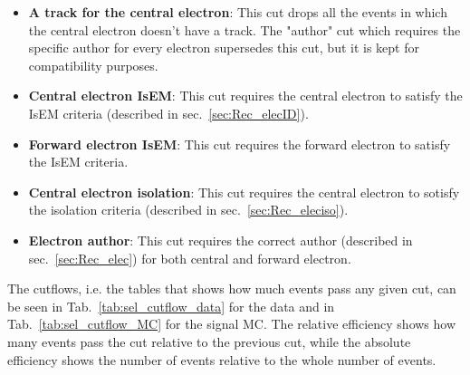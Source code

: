 \begin{itemize}
\item {\bfseries A track for the central electron}: This cut drops all the events in which the central electron doesn't have a track. The "author" cut which requires the specific author for every electron supersedes this cut, but it is kept for compatibility purposes.
\item {\bfseries Central electron IsEM}: This cut requires the central electron to satisfy the IsEM criteria (described in sec.~\ref{sec:Rec_elecID}).
\item {\bfseries Forward electron IsEM}: This cut requires the forward electron to satisfy the IsEM criteria.
\item {\bfseries Central electron isolation}: This cut requires the central electron to sotisfy the isolation criteria (described in sec.~\ref{sec:Rec_eleciso}).
\item {\bfseries Electron author}: This cut requires the correct author (described in sec.~\ref{sec:Rec_elec}) for both central and forward electron.
\end{itemize}

The cutflows, i.e. the tables that shows how much events pass any given cut, can be seen in Tab.~\ref{tab:sel_cutflow_data} for the data and in Tab.~\ref{tab:sel_cutflow_MC} for the signal MC. The relative efficiency shows how many events pass the cut relative to the previous cut, while the absolute efficiency shows the number of events relative to the whole number of events.

